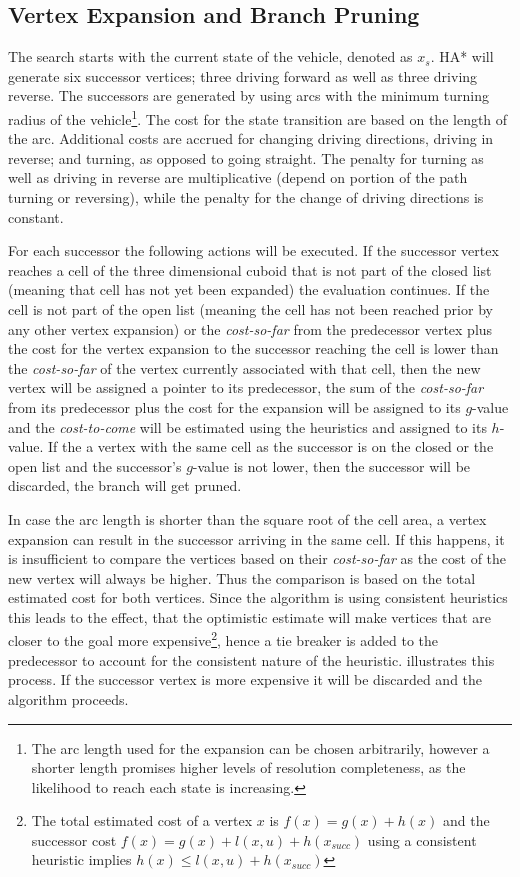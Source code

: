 \subsection{Vertex Expansion and Branch Pruning}
The search starts with the current state of the vehicle, denoted as $x_s$. HA* will generate six successor vertices; three driving forward as well as three driving reverse. The successors are generated by using arcs with the minimum turning radius of the vehicle\footnote{The arc length used for the expansion can be chosen arbitrarily, however a shorter length promises higher levels of resolution completeness, as the likelihood to reach each state is increasing.}. The cost for the state transition are based on the length of the arc. Additional costs are accrued for changing driving directions, driving in reverse; and turning, as opposed to going straight. The penalty for turning as well as driving in reverse are multiplicative (depend on portion of the path turning or reversing), while the penalty for the change of driving directions is constant.

For each successor the following actions will be executed. If the successor vertex reaches a cell of the three dimensional cuboid that is not part of the closed list (meaning that cell has not yet been expanded) the evaluation continues. If the cell is not part of the open list (meaning the cell has not been reached prior by any other vertex expansion) or the \textit{cost-so-far} from the predecessor vertex plus the cost for the vertex expansion to the successor reaching the cell is lower than the \textit{cost-so-far} of the vertex currently associated with that cell, then the new vertex will be assigned a pointer to its predecessor, the sum of the \textit{cost-so-far} from its predecessor plus the cost for the expansion will be assigned to its $g$-value and the \textit{cost-to-come} will be estimated using the heuristics and assigned to its $h$-value. If the a vertex with the same cell as the successor is on the closed or the open list and the successor's $g$-value is not lower, then the successor will be discarded, the branch will get pruned.

In case the arc length is shorter than the square root of the cell area, a vertex expansion can result in the successor arriving in the same cell. 
If this happens, it is insufficient to compare the vertices based on their \textit{cost-so-far} as the cost of the new vertex will always be higher. Thus the comparison is based on the total estimated cost for both vertices. Since the algorithm is using consistent heuristics this leads to the effect, that the optimistic estimate will make vertices that are closer to the goal more expensive\footnote{The total estimated cost of a vertex $x$ is $f(x) = g(x)+h(x)$ and the successor cost $f(x) = g(x) + l(x,u)  + h(x_{succ}) $ using a consistent heuristic implies $ h(x) \leq  l(x,u)  + h(x_{succ})$}, hence a tie breaker is added to the predecessor to account for the consistent nature of the heuristic. illustrates this process. If the successor vertex is more expensive it will be discarded and the algorithm proceeds.

